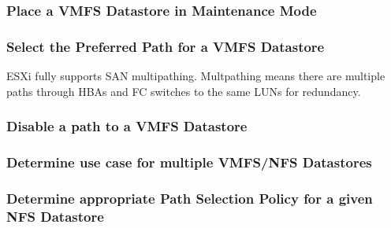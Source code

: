 \subsubsection{Place a VMFS Datastore in Maintenance Mode}

\subsubsection{Select the Preferred Path for a VMFS Datastore}

ESXi fully supports SAN multipathing. Multpathing means there are multiple
paths through HBAs and FC switches to the same LUNs for redundancy.

\subsubsection{Disable a path to a VMFS Datastore}

\subsubsection{Determine use case for multiple VMFS/NFS Datastores}

\subsubsection{Determine appropriate Path Selection Policy for a given NFS Datastore}
